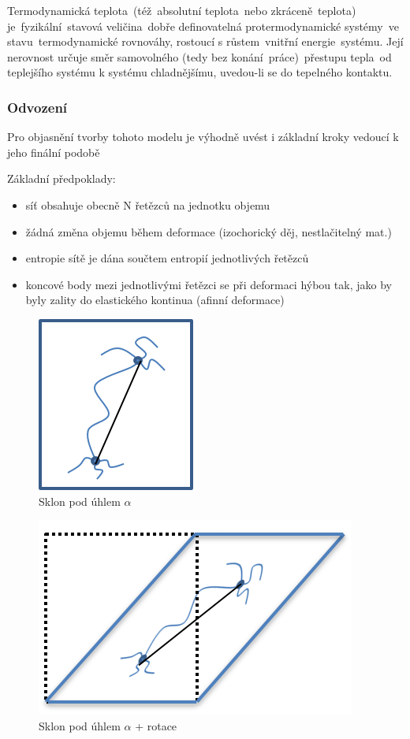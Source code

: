 Termodynamická teplota (též absolutní teplota nebo zkráceně teplota) je fyzikální stavová veličina dobře definovatelná protermodynamické systémy ve stavu termodynamické rovnováhy, rostoucí s růstem vnitřní energie systému. Její nerovnost určuje směr samovolného (tedy bez konání práce) přestupu tepla od teplejšího systému k systému chladnějšímu, uvedou-li se do tepelného kontaktu.

\subsubsection{Odvození}
Pro objasnění tvorby tohoto modelu je výhodně uvést i základní kroky vedoucí k jeho finální podobě

Základní předpoklady:
\begin{itemize}
	\item síť obsahuje obecně N řetězců na jednotku objemu
	\item žádná změna objemu během deformace (izochorický děj, nestlačitelný mat.)
	\item entropie sítě je dána součtem entropií jednotlivých řetězců
	\item koncové body mezi jednotlivými řetězci se při deformaci hýbou tak, jako by byly zality do elastického kontinua (afinní deformace)
\end{itemize}

\begin{figure}[H]
	\centering
	\includegraphics{Obrazky/sklon}
	\caption{Sklon pod úhlem $\alpha$}
	\label{fig:sklon}
\end{figure}
\begin{figure}[H]
	\centering
	\includegraphics{Obrazky/sklon-rotace}
	\caption{Sklon pod úhlem $\alpha$ + rotace}
	\label{fig:sklon-rotace}
\end{figure}

